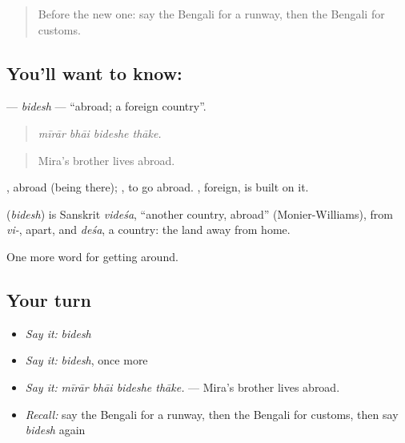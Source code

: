 \label{lesson:BN-C395-bidesh}



\begin{quote}
Before the new one: say the Bengali for a runway, then the Bengali for customs.
\end{quote}

\subsection*{You'll want to know: }
\textbf{} — \emph{bidesh} — \textquotedblleft{}abroad; a foreign country\textquotedblright{}.

\begin{quote}
   
\end{quote}

\begin{quote}
\emph{mīrār bhāi bideshe thāke.}
\end{quote}

\begin{quote}
Mira's brother lives abroad.
\end{quote}

, abroad (being there);  , to go abroad. , foreign, is built on it.

\begin{cousinweb}
\textbf{} (\emph{bidesh}) is Sanskrit \emph{videśa}, \textquotedblleft{}another country, abroad\textquotedblright{} (Monier-Williams), from \emph{vi-}, apart, and \emph{deśa}, a country: the land away from home.
\end{cousinweb}

\begin{grammarlens}[title={What you've built}]
One more word for getting around.
\end{grammarlens}

\subsection*{Your turn}
\begin{itemize}
\raggedright
  \item \emph{Say it:} \emph{bidesh}
  \item \emph{Say it:} \emph{bidesh}, once more
  \item \emph{Say it:} \emph{mīrār bhāi bideshe thāke.} — Mira's brother lives abroad.
  \item \emph{Recall:} say the Bengali for a runway, then the Bengali for customs, then say \emph{bidesh} again
\end{itemize}

